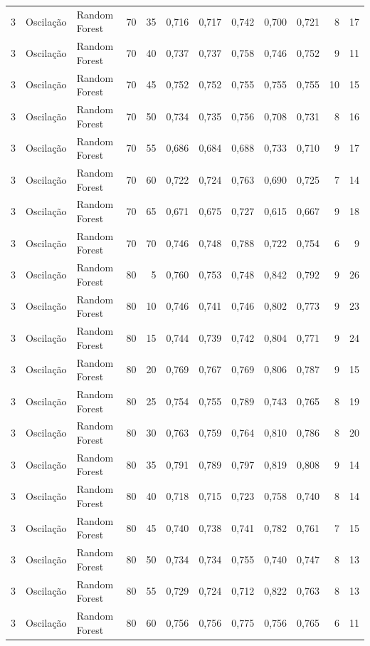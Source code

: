 \begin{longtable}{@{}rllrrrrrrrrr@{}}
3 & Oscilação & Random Forest & 70 & 35 & 0,716 & 0,717 & 0,742 & 0,700 & 0,721 & 8 & 17 \\
3 & Oscilação & Random Forest & 70 & 40 & 0,737 & 0,737 & 0,758 & 0,746 & 0,752 & 9 & 11 \\
3 & Oscilação & Random Forest & 70 & 45 & 0,752 & 0,752 & 0,755 & 0,755 & 0,755 & 10 & 15 \\
3 & Oscilação & Random Forest & 70 & 50 & 0,734 & 0,735 & 0,756 & 0,708 & 0,731 & 8 & 16 \\
3 & Oscilação & Random Forest & 70 & 55 & 0,686 & 0,684 & 0,688 & 0,733 & 0,710 & 9 & 17 \\
3 & Oscilação & Random Forest & 70 & 60 & 0,722 & 0,724 & 0,763 & 0,690 & 0,725 & 7 & 14 \\
3 & Oscilação & Random Forest & 70 & 65 & 0,671 & 0,675 & 0,727 & 0,615 & 0,667 & 9 & 18 \\
3 & Oscilação & Random Forest & 70 & 70 & 0,746 & 0,748 & 0,788 & 0,722 & 0,754 & 6 & 9 \\
3 & Oscilação & Random Forest & 80 & 5 & 0,760 & 0,753 & 0,748 & 0,842 & 0,792 & 9 & 26 \\
3 & Oscilação & Random Forest & 80 & 10 & 0,746 & 0,741 & 0,746 & 0,802 & 0,773 & 9 & 23 \\
3 & Oscilação & Random Forest & 80 & 15 & 0,744 & 0,739 & 0,742 & 0,804 & 0,771 & 9 & 24 \\
3 & Oscilação & Random Forest & 80 & 20 & 0,769 & 0,767 & 0,769 & 0,806 & 0,787 & 9 & 15 \\
3 & Oscilação & Random Forest & 80 & 25 & 0,754 & 0,755 & 0,789 & 0,743 & 0,765 & 8 & 19 \\
3 & Oscilação & Random Forest & 80 & 30 & 0,763 & 0,759 & 0,764 & 0,810 & 0,786 & 8 & 20 \\
3 & Oscilação & Random Forest & 80 & 35 & 0,791 & 0,789 & 0,797 & 0,819 & 0,808 & 9 & 14 \\
3 & Oscilação & Random Forest & 80 & 40 & 0,718 & 0,715 & 0,723 & 0,758 & 0,740 & 8 & 14 \\
3 & Oscilação & Random Forest & 80 & 45 & 0,740 & 0,738 & 0,741 & 0,782 & 0,761 & 7 & 15 \\
3 & Oscilação & Random Forest & 80 & 50 & 0,734 & 0,734 & 0,755 & 0,740 & 0,747 & 8 & 13 \\
3 & Oscilação & Random Forest & 80 & 55 & 0,729 & 0,724 & 0,712 & 0,822 & 0,763 & 8 & 13 \\
3 & Oscilação & Random Forest & 80 & 60 & 0,756 & 0,756 & 0,775 & 0,756 & 0,765 & 6 & 11 \\

\end{longtable}
